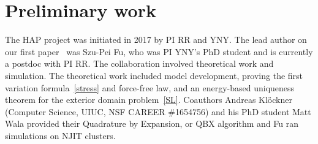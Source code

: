 \begin{table}
  \vspace{-8pt}
\caption{\label{tab:moduli} \footnotesize Comparision of values elastic
  moduli from the experimental literature and values derived by HAP
  simulation.} 
\end{table}
\section{Preliminary work}
\label{sec:preliminary_work}
The HAP project was initiated in 2017 by PI RR and YNY. The lead author
on our first paper~\cite{Fu2018_SIAM} was Szu-Pei Fu, who was PI YNY's
PhD student and is currently a postdoc with PI RR. The collaboration
involved theoretical work and simulation. The theoretical work included
model development, proving the first variation formula~\eqref{stress}
and force-free law, and an energy-based uniqueness theorem for the
exterior domain problem~\eqref{SL}. Coauthors Andreas Kl\"ockner
(Computer Science, UIUC, NSF CAREER \#1654756) and his PhD student Matt
Wala provided their Quadrature by Expansion, or QBX algorithm and Fu ran
simulations on NJIT clusters.

